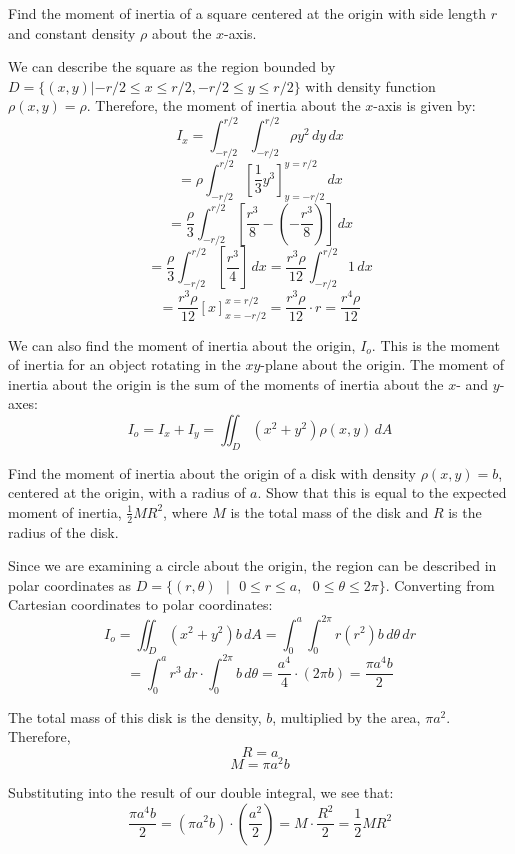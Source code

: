 \begin{Worked}
\begin{Problem}
Find the moment of inertia of a square centered at the origin
with side length $r$ and constant density $\rho$ about the $x$-axis.
\end{Problem}
\begin{Solution}
We can describe the square as the region bounded by $
\textit{D} = \{(x, y)| -r/2 \leq x \leq r/2, -r/2 \leq y \leq r/2 \}$ with 
density function $\rho(x, y) = \rho$. Therefore, the moment of inertia about 
the $x$-axis is given by:
$$I_x = \int_{-r/2}^{r/2} \int_{-r/2}^{r/2} \rho y^2 \,dy\,dx$$
$$= \rho \int_{-r/2}^{r/2} \left[ \frac{1}{3} y^3 \right]_{y = -r/2}^{y = r/2} 
\,dx$$
$$= \frac{\rho}{3} \int_{-r/2}^{r/2} \left[ \frac{r^3}{8} - \left( -\frac{r^3}{
8} \right) \right]\,dx$$
$$= \frac{\rho}{3} \int_{-r/2}^{r/2} \left[ \frac{r^3}{4} \right]\,dx = \frac{
r^3 \rho}{12} \int_{-r/2}^{r/2} 1\,dx$$
$$= \frac{r^3 \rho}{12} \left[ x \right]_{x = -r/2}^{x = r/2} = \frac{r^3 \rho
}{12} \cdot r = \frac{r^4 \rho}{12}$$
\end{Solution}
\end{Worked}

We can also find the moment of inertia about the origin, $I_o$. This is the 
moment of inertia for an object rotating in the $xy$-plane about the origin. 
The moment of inertia about the origin is the sum of the moments of inertia 
about the $x$- and $y$-axes:
$$I_o = I_x + I_y = \iint_{\textit{D}} \left( x^2 + y^2 \right) \rho(x, y)\,
dA$$

\begin{Worked}
\begin{Problem}
Find the moment of inertia about the origin of a disk with
density $\rho(x, y) = b$, centered at the origin, with a radius of $a$. Show that 
this is equal to the expected moment of inertia, $\frac{1}{2}MR^2$, where $M$ 
is the total mass of the disk and $R$ is the radius of the disk.
\end{Problem}
\begin{Solution}
Since we are examining a circle about the origin, the
region can be described in polar coordinates as $\textit{D} = \{(r, \theta)
\text{ }|\text{ } 0 \leq r \leq a, \text{ }0 \leq \theta \leq 2\pi \}$. 
Converting from Cartesian coordinates to polar coordinates:
$$I_o = \iint_{\textit{D}} \left(x ^2 + y^2 \right) b\,dA = \int_0^a \int_0^{2
\pi} r \left( r^2 \right) b\,d\theta \,d r$$
$$= \int_0^a r^3\,dr \cdot \int_0^{2\pi}b \,d\theta = \frac{a^4}{4} \cdot 
\left(2\pi b \right) = \frac{\pi a^4 b}{2}$$

The total mass of this disk is the density, $b$, multiplied by the area, $\pi 
a^2$. Therefore,
$$R = a$$
$$M = \pi a^2 b$$

Substituting into the result of our double integral, we see that:
$$\frac{\pi a^4 b}{2} = \left( \pi a^2 b \right) \cdot \left( \frac{a^2}{2} 
\right) = M \cdot \frac{R^2}{2} = \frac{1}{2}MR^2$$
\end{Solution}
\end{Worked}

